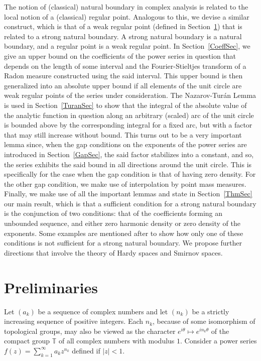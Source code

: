 \documentclass[11pt,a4paper]{article}
\newcommand{\T}{\mathbb{T}}
\begin{document}
The notion of (classical) natural boundary in complex analysis is related to the local notion of a (classical) regular point. Analogous to this, we devise a similar construct, which is that of a weak regular point (defined in Section~\ref{PrelimSec}) that is related to a strong natural boundary. A strong natural boundary is a natural boundary, and a regular point is a weak regular point. In Section~\ref{CoeffSec}, we give an upper bound on the coefficients of the power series in question that depends on the length of some interval and the Fourier-Stieltjes transform of a Radon measure constructed using the said interval. This upper bound is then generalized into an absolute upper bound if all elements of the unit circle are weak regular points of the series under consideration. The Nazarov-Tur\'an Lemma is used in Section~\ref{TuranSec} to show that the integral of the absolute value of the analytic function in question along an arbitrary (scaled) arc of the unit circle is bounded above by the corresponding integral for a fixed arc, but with a factor that may still increase without bound. This turns out to be a very important lemma since, when the gap conditions on the exponents of the power series are introduced in Section~\ref{GapSec}, the said factor stabilizes into a constant, and so, the series exhibits the said bound in all directions around the unit circle. This is specifically for the case when the gap condition is that of having zero density. For the other gap condition, we make use of interpolation by point mass measures. Finally, we make use of all the important lemmas and state in Section~\ref{ThmSec} our main result, which is that a sufficient condition for a strong natural boundary is the conjunction of two conditions: that of the coefficients forming an unbounded sequence, and either zero harmonic density or zero density of the exponents. Some examples are mentioned after to show how only one of these conditions is not sufficient for a strong natural boundary. We propose further directions that involve the theory of Hardy spaces and Smirnov spaces.

\section{Preliminaries}\label{PrelimSec}

Let $(a_k)$ be a sequence of complex numbers and let $(n_k)$ be a strictly increasing sequence of positive integers. Each $n_k$, because of some isomorphism of topological groups, may also be viewed as the character $e^{i\theta}\mapsto e^{in_k\theta}$ of the compact group $\T$ of all complex numbers with modulus $1$. Consider a power series $f(z)=\sum_{k=1}^\infty a_kz^{n_k}$ defined if $|z|<1$.
\end{document}
